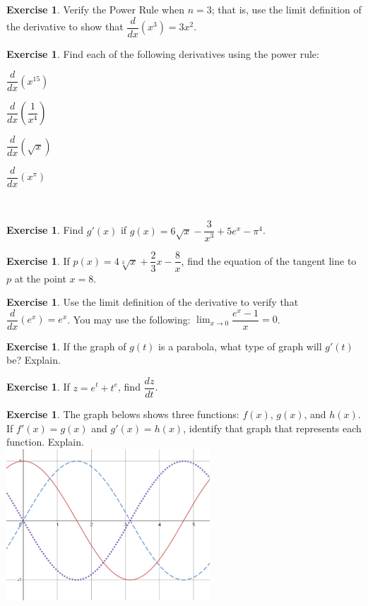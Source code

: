 \documentclass[11pt,reqno,final]{amsart}
\numberwithin{figure}{section}
\theoremstyle{definition} %
\newtheorem{exercise}[question]{Exercise}
\newcommand{\dlim}{\displaystyle\lim}
\begin{document}
\begin{exercise}
        Verify the Power Rule when $n = 3$; that is, use the limit definition of the derivative to show that $\dfrac{d}{dx}(x^3)=3x^2$.
\end{exercise}

\newpage

\begin{exercise}
        Find each of the following derivatives using the power rule:\\
        \begin{enumerate*}[(a)]
        \item $\dfrac{d}{dx}(x^{15})$ \qquad \qquad $ $
        \item $\dfrac{d}{dx}\left( \dfrac{1}{x^4} \right)$ \qquad \qquad $ $
        \item $\dfrac{d}{dx}(\sqrt{x})$ \qquad \qquad
        \item $\dfrac{d}{dx}(x^\pi)$\\
        \end{enumerate*}
\end{exercise}

$ $\\[10pt]

\begin{exercise}
        Find $g'(x)$ if $g(x) = 6\sqrt{x} - \dfrac{3}{x^3} + 5e^x - \pi^4$.
        \vfill
\end{exercise}

\begin{exercise}
        If $p(x) = 4 \sqrt[3]{x} + \dfrac{2}{3} x - \dfrac{8}{x}$,
        find the equation of the tangent line to $p$ at the point $x=8$.
        \vfill
\end{exercise}

\begin{exercise}
        Use the limit definition of the derivative to verify that $\dfrac{d}{dx}(e^x) = e^x$.
        You may use the following: $\dlim_{x \to 0}\dfrac{e^x-1}{x} = 0$.
        \vfill
\end{exercise}

\newpage

\begin{exercise}
        If the graph of $g(t)$ is a parabola, what type of graph will $g'(t)$ be? Explain.
        \vfill
\end{exercise}
        
\begin{exercise}
        If $z = e^t + t^e$, find $\dfrac{dz}{dt}$.
        \vfill
        \vfill
\end{exercise}

\begin{exercise}
        The graph belows shows three functions: $f(x)$, $g(x)$, and $h(x)$.
        If $f'(x) = g(x)$ and $g'(x) = h(x)$, identify that graph that represents each function. Explain.\\
        \includegraphics[width=3in]{10-12P_sins.png}
        \vfill
\end{exercise}
\end{document}
